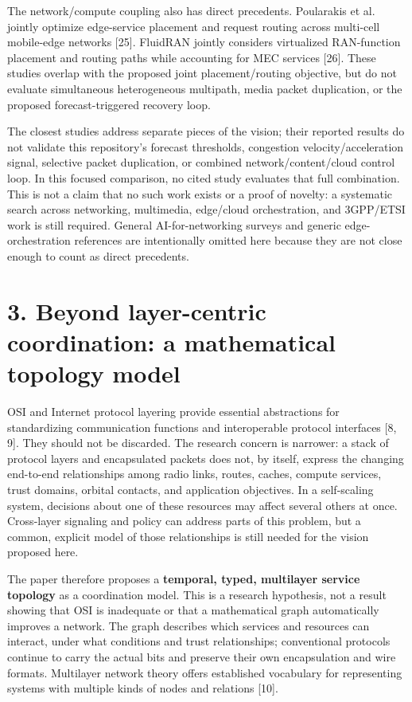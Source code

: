 \documentclass[
  american,
  11pt,
]{article}
\begin{document}
The network/compute coupling also has direct precedents. Poularakis et
al. jointly optimize edge-service placement and request routing across
multi-cell mobile-edge networks {[}25{]}. FluidRAN jointly considers
virtualized RAN-function placement and routing paths while accounting
for MEC services {[}26{]}. These studies overlap with the proposed joint
placement/routing objective, but do not evaluate simultaneous
heterogeneous multipath, media packet duplication, or the proposed
forecast-triggered recovery loop.

The closest studies address separate pieces of the vision; their
reported results do not validate this repository's forecast thresholds,
congestion velocity/acceleration signal, selective packet duplication,
or combined network/content/cloud control loop. In this focused
comparison, no cited study evaluates that full combination. This is not
a claim that no such work exists or a proof of novelty: a systematic
search across networking, multimedia, edge/cloud orchestration, and
3GPP/ETSI work is still required. General AI-for-networking surveys and
generic edge-orchestration references are intentionally omitted here
because they are not close enough to count as direct precedents.

\section{3. Beyond layer-centric coordination: a mathematical topology
model}\label{beyond-layer-centric-coordination-a-mathematical-topology-model}

OSI and Internet protocol layering provide essential abstractions for
standardizing communication functions and interoperable protocol
interfaces {[}8, 9{]}. They should not be discarded. The research
concern is narrower: a stack of protocol layers and encapsulated packets
does not, by itself, express the changing end-to-end relationships among
radio links, routes, caches, compute services, trust domains, orbital
contacts, and application objectives. In a self-scaling system,
decisions about one of these resources may affect several others at
once. Cross-layer signaling and policy can address parts of this
problem, but a common, explicit model of those relationships is still
needed for the vision proposed here.

The paper therefore proposes a \textbf{temporal, typed, multilayer
service topology} as a coordination model. This is a research
hypothesis, not a result showing that OSI is inadequate or that a
mathematical graph automatically improves a network. The graph describes
which services and resources can interact, under what conditions and
trust relationships; conventional protocols continue to carry the actual
bits and preserve their own encapsulation and wire formats. Multilayer
network theory offers established vocabulary for representing systems
with multiple kinds of nodes and relations {[}10{]}.
\end{document}

